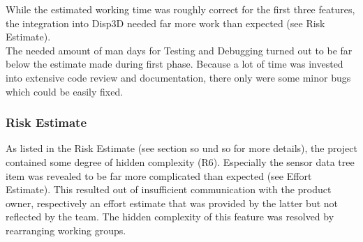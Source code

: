 While the estimated working time was roughly correct for the first three features, the integration into Disp3D needed far more work than expected (see Risk Estimate).\\
The needed amount of man days for Testing and Debugging turned out to be far below the estimate made during first phase. Because a lot of time was invested into extensive code review and documentation, there only were some minor bugs which could be easily fixed.


\subsubsection{Risk Estimate}

As listed in the Risk Estimate (see section so und so for more details), the project contained some degree of hidden complexity (R6). Especially the sensor data tree item was revealed to be far more complicated than expected (see Effort Estimate). This resulted out of insufficient communication with the product owner, respectively an effort estimate that was provided by the latter but not reflected by the team. The hidden complexity of this feature was resolved by rearranging working groups.
